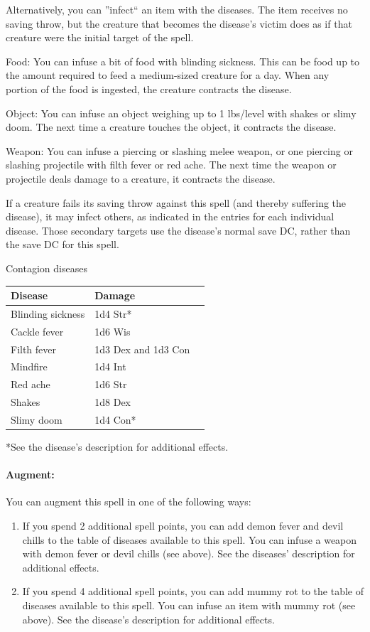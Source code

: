 Alternatively, you can ''infect`` an item with the diseases.
The item receives no saving throw, but the creature that becomes the disease's victim
does as if that creature were the initial target of the spell.
\begin{list}{}{\leftmargin=1em}
 \item Food: You can infuse a bit of food with blinding sickness. 
 This can be food up to the amount required to feed a medium-sized creature for a day.
 When any portion of the food is ingested, the creature contracts the disease.
 \item Object: You can infuse an object weighing up to 1 lbs/level 
 with shakes or slimy doom.
 The next time a creature touches the object, it contracts the disease.
 \item Weapon: You can infuse a piercing or slashing melee weapon, or one piercing or slashing
 projectile with filth fever or red ache. The next time the weapon or projectile deals damage
 to a creature, it contracts the disease.
\end{list}
If a creature fails its saving throw against this spell (and thereby suffering the disease), it
may infect others, as indicated in the entries for each individual disease. 
Those secondary
targets use the disease's normal save DC, rather than the save DC for this spell.
\begin{tableonecolumn}
\label{tab:Contagion}
\caption{Contagion diseases}
\begin{tabular}{|l|l|l|}
\hline
Disease&Damage\\ 
\hline
Blinding sickness&1d4 Str*\\ 
Cackle fever&1d6 Wis\\ 
Filth fever&1d3 Dex and 1d3 Con\\ 
Mindfire&1d4 Int\\ 
Red ache&1d6 Str\\ 
Shakes&1d8 Dex\\ 
Slimy doom&1d4 Con*\\ 
\hline
\end{tabular}

*See the disease's description for additional effects.
\end{tableonecolumn}

\paragraph{Augment:} You can augment this spell in one of the following ways:
\begin{enumerate}
 \item If you spend 2 additional spell points, you can add demon fever and devil chills
 to the table of diseases available to this spell. You can infuse a weapon with
 demon fever or devil chills (see above). 
 See the diseases' description for additional effects.
 \item If you spend 4 additional spell points, you can add mummy rot to the table of
 diseases available to this spell. You can infuse an item with mummy rot (see above).
 See the disease's description for additional effects.
\end{enumerate}

